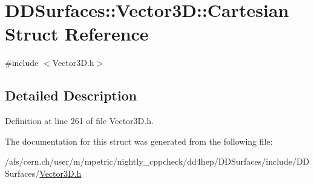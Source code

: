 \hypertarget{struct_d_d_surfaces_1_1_vector3_d_1_1_cartesian}{
\section{DDSurfaces::Vector3D::Cartesian Struct Reference}
\label{struct_d_d_surfaces_1_1_vector3_d_1_1_cartesian}
}


{\ttfamily \#include $<$Vector3D.h$>$}

\subsection{Detailed Description}


Definition at line 261 of file Vector3D.h.

The documentation for this struct was generated from the following file:\begin{DoxyCompactItemize}
\item 
/afs/cern.ch/user/m/mpetric/nightly\_\-cppcheck/dd4hep/DDSurfaces/include/DDSurfaces/\hyperlink{_vector3_d_8h}{Vector3D.h}\end{DoxyCompactItemize}
